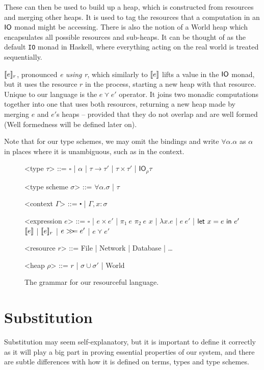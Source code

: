 These can then be used to build up a heap, which is constructed from
resources and merging other heaps. It is used to tag the resources
that a computation in an $\IO$ monad might be accessing. There is also
the notion of a \textsf{World} heap which encapsulates all possible
resources and sub-heaps. It can be thought of as the default
\texttt{IO} monad in Haskell, where everything acting on the real
world is treated sequentially.

$\use{r}{e}$, pronounced \textit{e using r}, which similarly to
$\lift{e}$ lifts a value in the $\IO$ monad, but it uses the resource
$r$ in the process, starting a new heap with that resource. Unique to
our language is the $e \curlyvee e'$ operator. It joins two monadic
computations together into one that uses both resources, returning a
new heap made by merging $e$ and $e'$s heaps -- provided that they do
not overlap and are well formed (Well formedness will be defined later
on).

Note that for our type schemes, we may omit the bindings and write
$\forall \alpha . \alpha$ as $\alpha$ in places where it is unambiguous, such as in the context.

\begin{figure}
\begin{grammar}

  <type $\tau$> ::= $\square$ | $\alpha$ | $\tau \rightarrow \tau'$ | $\tau \times \tau'$ | $\textsf{IO}_\rho \tau$
  
  <type scheme $\sigma$> ::= $\forall \alpha . \sigma$ | $\tau$

  <context $\Gamma$> ::= $\centerdot$ | $\Gamma , x : \sigma$

  <expression $e$> ::= $\square$ | $e \times e'$ | $\pi_1 \ e$ $\pi_2 \ e$
  \alt $x$ | $\lambda x . e$ | $e \ e'$ | $\letin{x = e}{e'}$
  \alt $\lift{e}$ | $\use{r}{e}$ | $e \bind e'$ | $e \curlyvee e'$

  <resource $r$> ::= \textsf{File} | \textsf{Network} |
  \textsf{Database} | \ldots

  <heap $\rho$> ::= $r$ | $\sigma \cup \sigma'$ | \textsf{World}

\end{grammar}
\caption{The grammar for our resourceful language.} \label{fig:grammar}
\end{figure}

\section{Substitution}
Substitution may seem self-explanatory, but it is important to define
it correctly as it will play a big part in proving essential
properties of our system, and there are subtle differences with how it
is defined on terms, types and type schemes.

